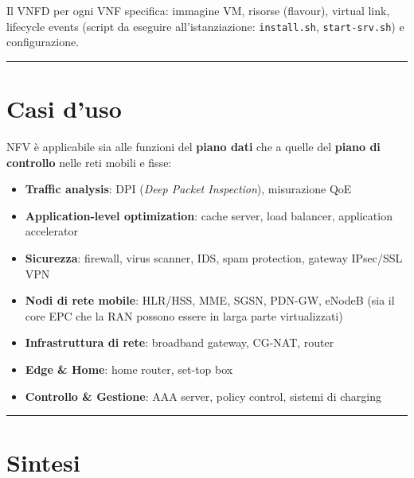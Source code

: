 \documentclass[
  italian,
  openany]{book}
\providecommand{\tightlist}{%
  \setlength{\itemsep}{0pt}\setlength{\parskip}{0pt}}
\begin{document}
Il VNFD per ogni VNF specifica: immagine VM, risorse (flavour), virtual
link, lifecycle events (script da eseguire all'istanziazione:
\texttt{install.sh}, \texttt{start-srv.sh}) e configurazione.

\begin{center}\rule{0.5\linewidth}{0.5pt}\end{center}

\section{Casi d'uso}\label{casi-duso}

NFV è applicabile sia alle funzioni del \textbf{piano dati} che a quelle
del \textbf{piano di controllo} nelle reti mobili e fisse:

\begin{itemize}
\tightlist
\item
  \textbf{Traffic analysis}: DPI (\emph{Deep Packet Inspection}),
  misurazione QoE
\item
  \textbf{Application-level optimization}: cache server, load balancer,
  application accelerator
\item
  \textbf{Sicurezza}: firewall, virus scanner, IDS, spam protection,
  gateway IPsec/SSL VPN
\item
  \textbf{Nodi di rete mobile}: HLR/HSS, MME, SGSN, PDN-GW, eNodeB (sia
  il core EPC che la RAN possono essere in larga parte virtualizzati)
\item
  \textbf{Infrastruttura di rete}: broadband gateway, CG-NAT, router
\item
  \textbf{Edge \& Home}: home router, set-top box
\item
  \textbf{Controllo \& Gestione}: AAA server, policy control, sistemi di
  charging
\end{itemize}

\begin{center}\rule{0.5\linewidth}{0.5pt}\end{center}

\section{Sintesi}\label{sintesi-1}
\end{document}
